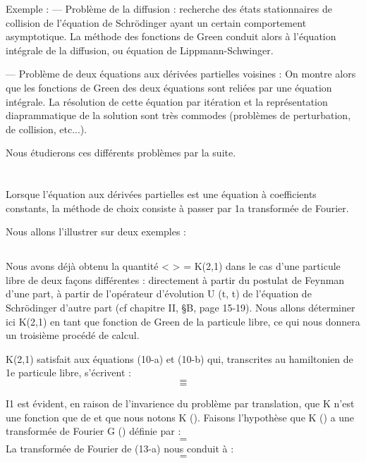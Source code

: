 Exemple : — Problème de la diffusion : recherche des états stationnaires de
collision de l'équation de Schrödinger ayant un certain comportement
asymptotique. La méthode des fonctions de Green conduit alors à l'équation
intégrale de la diffusion, ou équation de Lippmann-Schwinger.

— Problème de deux équations aux dérivées partielles voisines :
On montre alors que les fonctions de Green des deux équations sont reliées
par une équation intégrale. La résolution de cette équation par itération
et la représentation diaprammatique de la solution sont très commodes
(problèmes de perturbation, de collision, etc...).

Nous étudierons ces différents problèmes par la suite.

\section{}%

Lorsque l'équation aux dérivées partielles est une équation à
coefficients constants, la méthode de choix consiste à passer par 1a
transformée de Fourier.

Nous allons l'illustrer sur deux exemples :

\subsection{}%

Nous avons déjà obtenu la quantité <  > = K(2,1)
dans le cas d'une particule libre de deux façons différentes : directement
à partir du postulat de Feynman d'une part, à partir de l'opérateur d'évolution
U (t, t) de l'équation de Schrödinger d'autre part (cf chapitre II,
\S B, page 15-19). Nous allons déterminer ici K(2,1) en tant que fonction
de Green de la particule libre, ce qui nous donnera un troisième procédé
de calcul.

K(2,1) satisfait aux équations (10-a) et (10-b) qui, transcrites au hamiltonien de 1e particule libre, s'écrivent :
\[
\tag{13-a}=
\]
\[
\tag{13-b}=
\]

I1 est évident, en raison de l'invarience du problème par
translation, que K n'est une fonction que de  et  que
nous notons K (). Faisons l'hypothèse que K ()
a une transformée de Fourier G () définie par :
\[
\tag{14}=
\]
La transformée de Fourier de (13-a) nous conduit à :
\[
\tag{15}=
\]

